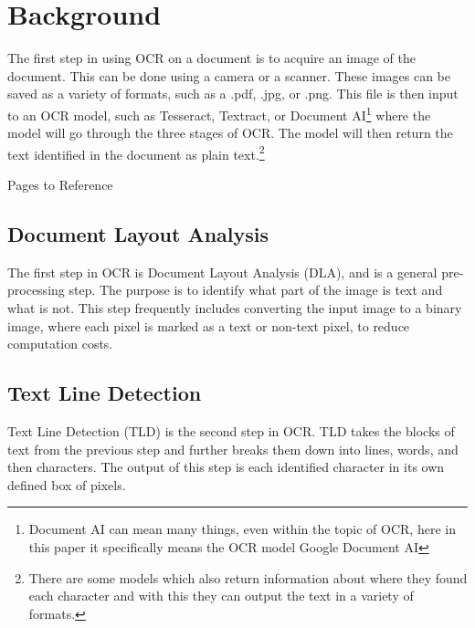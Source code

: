 \documentclass[sigplan,screen,nonacm]{acmart-tagged}
\begin{document}
\section{Background}
\label{sec:background}

The first step in using OCR on a document is to acquire an image of the document. This can be done using a camera or a scanner. These images can be saved as a variety of formats, such as a .pdf, .jpg, or .png. This file is then input to an OCR model, such as Tesseract, Textract, or Document AI\footnote{Document AI can mean many things, even within the topic of OCR, here in this paper it specifically means the OCR model Google Document AI} where the model will go through the three stages of OCR. The model will then return the text identified in the document as plain text.\footnote{There are some models which also return information about where they found each character and with this they can output the text in a variety of formats.} 

Pages to Reference\cite{Raj:2022,Avyodri:2022,Thorat:2022}

\subsection{Document Layout Analysis}
\label{DLA}

The first step in OCR is Document Layout Analysis (DLA), and is a general pre-processing step. The purpose is to identify what part of the image is text and what is not. 
This step frequently includes converting the input image to a binary image, where each pixel is marked as a text or non-text pixel, to reduce computation costs.

\subsection{Text Line Detection}
\label{TLD}

Text Line Detection (TLD) is the second step in OCR. TLD takes the blocks of text from the previous step and further breaks them down into lines, words, and then characters. The output of this step is each identified character in its own defined box of pixels.
\end{document}
